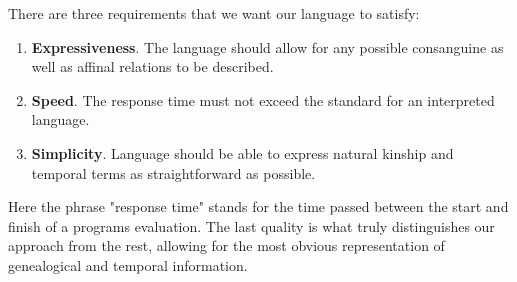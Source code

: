     There are three requirements that we want our language to satisfy:
    \begin{enumerate}
        \item{\textbf{Expressiveness}. The language should allow for any possible consanguine as well as affinal relations to be
            described.}
        \item{\textbf{Speed}. The response time must not exceed the standard for an interpreted language.}
        \item{\textbf{Simplicity}. Language should be able to express natural kinship and temporal terms as straightforward as possible.}
    \end{enumerate}
    Here the phrase "response time" stands for the time passed between the start and finish of a programs evaluation.
    The last quality is what truly distinguishes our approach from the rest, allowing for the most obvious representation of
    genealogical and temporal information.

